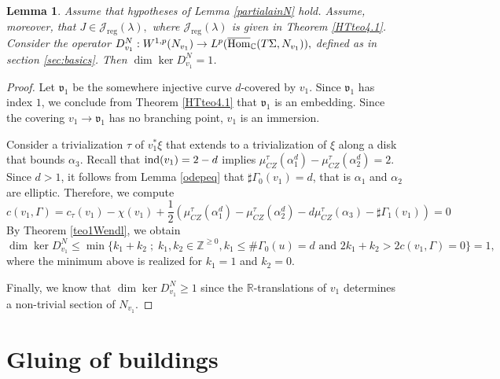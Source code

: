 \documentclass{amsart}
\newcommand{\C}{\mathbb{C}}
\newcommand{\R}{\mathbb{R}}
\newcommand{\Z}{\mathbb{Z}}
\newtheorem{lemma}[theorem]{Lemma}
\newcommand{\CZ}{\mu_{CZ}^{\tau}}
\newcommand{\ind}{\textnormal{ind}}
\begin{document}

\begin{lemma} \label{dim1} 
Assume that hypotheses of Lemma \ref{partialainN} hold. Assume, moreover, that $J \in \mathcal{J}_{\text{reg}}(\lambda),$ where $\mathcal{J}_{\text{reg}}(\lambda)$ is given in Theorem \ref{HTteo4.1}. Consider the  operator 
$
D_{v_1}^N: W^{1,p}(N_{v_1}) \to  L^p(\overline{\rm Hom}_{\C}(T\Sigma, N_{v_1})),$
defined as in section \ref{sec:basics}.  Then
 $\dim \ker D_{v_1}^N = 1$. 
\end{lemma}
\begin{proof}

 Let $\mathfrak{v}_1$ be the somewhere injective curve $d$-covered by $v_1$.  Since $\mathfrak{v}_1$ has index $1$, we conclude  from Theorem \ref{HTteo4.1} that $\mathfrak{v}_1$ is an embedding. Since the covering $v_1 \to \mathfrak{v}_1$ has no branching point, $v_1$ is an immersion.

Consider a trivialization $\tau$ of $v_1^*\xi$ that extends to a trivialization of $\xi$ along a disk that bounds $\alpha_3$. Recall that $\ind(v_1)=2-d$ implies  $\CZ(\alpha_1^d)-\CZ(\alpha_2^d)=2$. Since $d>1$, it follows from Lemma \ref{odepeq} that $\sharp \Gamma_0(v_1)=d$, that is $\alpha_1$ and $\alpha_2$ are elliptic. Therefore, we compute
 $$
 c(v_1,\Gamma)  = c_{\tau}(v_1)-\chi(v_1) +\frac{1}{2}(\CZ(\alpha_1^d)-\CZ(\alpha_2^d)-d\CZ(\alpha_3)-\sharp \Gamma_1(v_1))=0
 $$
 By Theorem \ref{teo1Wendl}, we obtain
  $$
  \dim \ker D_{v_1}^N \leq \min \big\{k_1+k_2 \; ; \; k_1,k_2\in \Z^{\geq 0}, k_1 \leq \#\Gamma_0(u)=d \mbox{ and } 2k_1+k_2> 2 c(v_1,\Gamma)=0\big\}=1,
  $$ where the minimum above is realized for $k_1=1$ and $k_2=0$.

  Finally, we know that $\dim \ker D_{v_1}^N\geq 1$ since the $\R$-translations of $v_1$ determines a non-trivial section of $N_{v_1}$.  \end{proof}



\section{Gluing of buildings}\label{sec:gluing}
\end{document}
